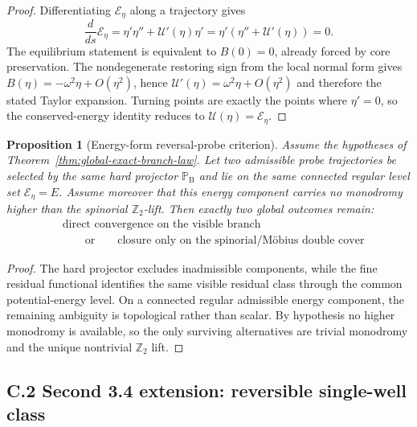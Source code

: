 \documentclass[12pt,a4paper]{article}
\newtheorem{proposition}[theorem]{Proposition}
\begin{document}
\begin{proof}
Differentiating $\mathcal E_\eta$ along a trajectory gives
\[
 \frac{d}{ds}\mathcal E_\eta = \eta'\eta''+\mathcal U'(\eta)\eta' = \eta'(\eta''+\mathcal U'(\eta))=0.
\]
The equilibrium statement is equivalent to $B(0)=0$, already forced by core preservation. The nondegenerate restoring sign from the local normal form gives $B(\eta)=-\omega^2\eta + O(\eta^2)$, hence $\mathcal U'(\eta)=\omega^2\eta + O(\eta^2)$ and therefore the stated Taylor expansion. Turning points are exactly the points where $\eta'=0$, so the conserved-energy identity reduces to $\mathcal U(\eta)=\mathcal E_\eta$.
\end{proof}

\begin{proposition}[Energy-form reversal-probe criterion]
\label{prop:energy-reversal-probe}
Assume the hypotheses of Theorem~\ref{thm:global-exact-branch-law}. Let two admissible probe trajectories be selected by the same hard projector $\mathbb P_{\mathrm B}$ and lie on the same connected regular level set $\mathcal E_\eta = E$. Assume moreover that this energy component carries no monodromy higher than the spinorial $\mathbb Z_2$-lift. Then exactly two global outcomes remain:
\[
\begin{aligned}
&\text{direct convergence on the visible branch}\\[0.2em]
&\qquad \text{or} \qquad
\text{closure only on the spinorial/M\"obius double cover}
\end{aligned}
\]
\end{proposition}

\begin{proof}
The hard projector excludes inadmissible components, while the fine residual functional identifies the same visible residual class through the common potential-energy level. On a connected regular admissible energy component, the remaining ambiguity is topological rather than scalar. By hypothesis no higher monodromy is available, so the only surviving alternatives are trivial monodromy and the unique nontrivial $\mathbb Z_2$ lift.
\end{proof}


\subsection*{C.2 Second 3.4 extension: reversible single-well class}
\end{document}

